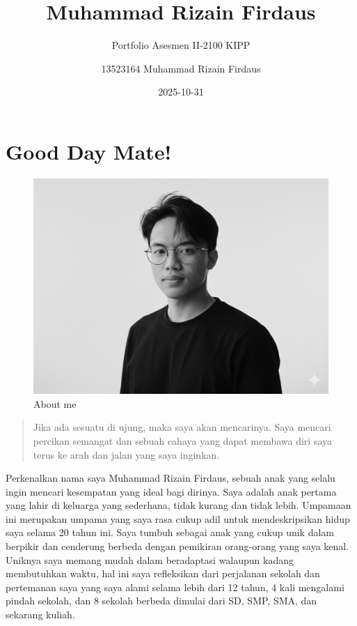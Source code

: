 \documentclass[
  letterpaper,
  DIV=11,
  numbers=noendperiod]{scrreprt}
\title{Muhammad Rizain Firdaus}
\subtitle{Portfolio Asesmen II-2100 KIPP}
\author{13523164 Muhammad Rizain Firdaus}
\date{2025-10-31}
\renewcommand*\contentsname{Table of contents}
\newcommand\contentsname{Table of contents}
\begin{document}
\maketitle

\renewcommand*\contentsname{Table of contents}
{
\hypersetup{linkcolor=}
\setcounter{tocdepth}{2}
\tableofcontents
}


\chapter*{Good Day Mate!}\label{good-day-mate}


\begin{figure}[H]

{\centering \includegraphics[width=1\linewidth,height=\textheight,keepaspectratio]{images/myself.jpg}

}

\caption{About me}

\end{figure}%

\begin{quote}
Jika ada sesuatu di ujung, maka saya akan mencarinya. Saya mencari
percikan semangat dan sebuah cahaya yang dapat membawa diri saya terus
ke arah dan jalan yang saya inginkan.
\end{quote}

Perkenalkan nama saya Muhammad Rizain Firdaus, sebuah anak yang selalu
ingin mencari kesempatan yang ideal bagi dirinya. Saya adalah anak
pertama yang lahir di keluarga yang sederhana, tidak kurang dan tidak
lebih. Umpamaan ini merupakan umpama yang saya rasa cukup adil untuk
mendeskripsikan hidup saya selama 20 tahun ini. Saya tumbuh sebagai anak
yang cukup unik dalam berpikir dan cenderung berbeda dengan pemikiran
orang-orang yang saya kenal. Uniknya saya memang mudah dalam beradaptasi
walaupun kadang membutuhkan waktu, hal ini saya refleksikan dari
perjalanan sekolah dan pertemanan saya yang saya alami selama lebih dari
12 tahun, 4 kali mengalami pindah sekolah, dan 8 sekolah berbeda dimulai
dari SD, SMP, SMA, dan sekarang kuliah.
\end{document}
